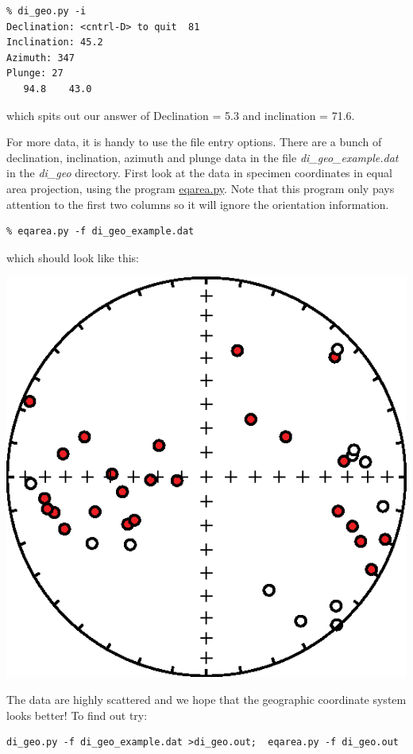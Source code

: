 \documentclass[11pt]{book}
\begin{document}
{{\begin{verbatim}
% di_geo.py -i
Declination: <cntrl-D> to quit  81
Inclination: 45.2
Azimuth: 347
Plunge: 27
   94.8    43.0
\end{verbatim}
\noindent which spits out our answer of Declination = 5.3 and inclination = 71.6.

For more data, it is handy to use the file entry options. There are a bunch of declination, inclination, azimuth and plunge data in the file {\it di\_geo\_example.dat} in the {\it di\_geo} directory.  First look at the data in specimen coordinates in equal area projection, using the program \href{#eqarea.py}{eqarea.py}.  Note that this program only pays attention to the first two columns so it will ignore the orientation information.

\begin{verbatim}
% eqarea.py -f di_geo_example.dat
\end{verbatim}
which should look like this:

  \includegraphics[width=12 cm]{EPSfiles/di_geo_spc_eq.eps}



The data are highly scattered and we hope that the geographic coordinate system looks better!  To find out try:
\begin{verbatim}
di_geo.py -f di_geo_example.dat >di_geo.out;  eqarea.py -f di_geo.out

\end{verbatim}

}}
\end{document}

